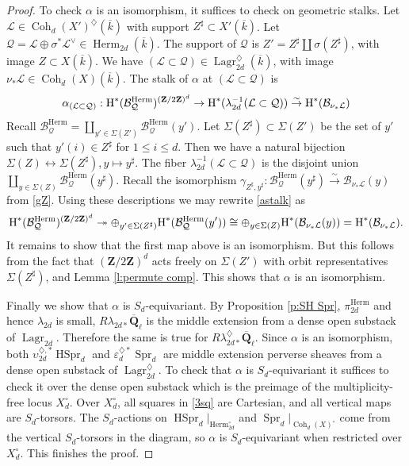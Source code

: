 \documentclass[reqno]{amsart}
\numberwithin{equation}{section}
\newcommand{\Q}{\mathbf{Q}}
\newcommand{\Z}{\mathbf{Z}}
\newcommand{\surj}{\twoheadrightarrow}
\DeclareMathOperator{\Herm}{Herm}
\DeclareMathOperator{\Lagr}{Lagr}
\DeclareMathOperator{\Coh}{Coh}
\DeclareMathOperator{\Spr}{Spr}
\DeclareMathOperator{\HSpr}{HSpr}
\newcommand\Sig{\Sigma}
\newcommand{\isom}{\stackrel{\sim}{\to}}
\newcommand{\bij}{\leftrightarrow}
\newcommand{\Qlbar}{\overline{\Q}_\ell}
\newcommand{\ov}{\overline}
\newcommand\op{\oplus}
\renewcommand\c{\circ}
\newcommand{\cohog}[2]{\textup{H}^{#1}({#2})}     %
\renewcommand\a\alpha
\newcommand\g\gamma
\newcommand{\e}{\varepsilon}
\newcommand{\s}{\sigma}
\renewcommand{\l}{\lambda}
\newcommand\dm{\diamondsuit}
\newcommand\sh{\sharp}
\newcommand\cB{\mathcal{B}}
\newcommand\cL{\mathcal{L}}
\newcommand\cQ{\mathcal{Q}}
\theoremstyle{remark}
\numberwithin{equation}{section}
\begin{document}
\begin{proof}
To check $\a$ is an isomorphism, it suffices to check on geometric stalks. Let $\cL\in \Coh_{d}(X')^{\dm}(\ov k)$ with support $Z^{\sh}\subset X'(\ov k)$. Let $\cQ=\cL\op \s^{*}\cL^{\vee}\in \Herm_{2d}(\ov k)$. The support of $\cQ$ is $Z'=Z^{\sh}\coprod \s(Z^{\sh})$, with image $Z\subset X(\ov k)$. We have $(\cL\subset \cQ)\in \Lagr^{\dm}_{2d}(\ov k)$, with image $\nu_{*}\cL\in\Coh_{d}(X)(\ov k)$. The stalk of $\a$ at $(\cL\subset\cQ)$ is
\begin{equation}\label{astalk}
\a_{(\cL\subset\cQ)}: \cohog{*}{\cB^{\Herm}_{\cQ}}^{(\Z/2\Z)^{d}}\to\cohog{*}{\l^{-1}_{2d}(\cL\subset\cQ)}\isom \cohog{*}{\cB_{\nu_{*}\cL}}
\end{equation}
Recall $\cB^{\Herm}_{\cQ}=\coprod_{y'\in\Sig(Z')}\cB^{\Herm}_{\cQ}(y')$. Let $\Sig(Z^{\sh})\subset \Sig(Z')$ be the set of $y'$ such that $y'(i)\in Z^{\sh}$ for $1\le i\le d$. Then we have a natural bijection $\Sig(Z)\bij\Sig(Z^{\sh}), y\mapsto y^{\sh}$. The fiber $\l^{-1}_{2d}(\cL\subset\cQ)$ is the disjoint union $\coprod_{y\in\Sig(Z)}\cB^{\Herm}_{\cQ}(y^{\sh})$. Recall the isomorphism $\g_{Z^{\sh}, y^{\sh}}:  \cB^{\Herm}_{\cQ}(y^{\sh})\isom  \cB_{\nu_{*}\cL}(y)$ from \eqref{gZ}. Using these descriptions we may rewrite \eqref{astalk} as
\begin{equation}
\cohog{*}{\cB^{\Herm}_{\cQ}}^{(\Z/2\Z)^{d}}  \surj \op_{y'\in\Sig(Z^{\sh})}\cohog{*}{\cB^{\Herm}_{\cQ}(y')}\cong \op_{y\in \Sig(Z)}\cohog{*}{\cB_{\nu_{*}\cL}(y)}=\cohog{*}{\cB_{\nu_{*}\cL}}.
\end{equation}
It remains to show that the first map above is an isomorphism. But this follows from the fact that  $(\Z/2\Z)^{d}$ acts freely on $\Sig(Z')$ with orbit representatives $\Sig(Z^{\sh})$, and Lemma \ref{l:permute comp}. This shows that $\a$ is an isomorphism. 


Finally we show that $\a$ is $S_{d}$-equivariant. By Proposition  \ref{p:SH Spr}, $\pi^{\Herm}_{2d}$ and hence $\l_{2d}$ is small,  $R\l_{2d*}\Qlbar$ is the middle extension from a dense open substack of $\Lagr_{2d}$. Therefore the same is true for $R\l^{\dm}_{2d*}\Qlbar$. Since $\a$ is an isomorphism, both $\upsilon^{\dm,*}_{2d}\HSpr_{d}$ and $\e^{\dm*}_{d}\Spr_{d}$ are middle extension perverse sheaves from a dense open substack of $\Lagr^{\dm}_{2d}$. To check that $\a$ is $S_{d}$-equivariant it suffices to check it over the dense open substack which is the preimage of the multiplicity-free locus $X_{d}^{\c}$. Over $X_{d}^{\c}$, all squares in \eqref{3sq} are Cartesian,  and all vertical maps are $S_{d}$-torsors. The $S_{d}$-actions on $\HSpr_{d}|_{\Herm_{2d}^{\c}}$ and $\Spr_{d}|_{\Coh_{d}(X)^{\c}}$ come from the vertical $S_{d}$-torsors in the diagram, so $\a$ is $S_{d}$-equivariant when restricted over $X_{d}^{\c}$. This finishes the proof.
\end{proof}
\end{document}
